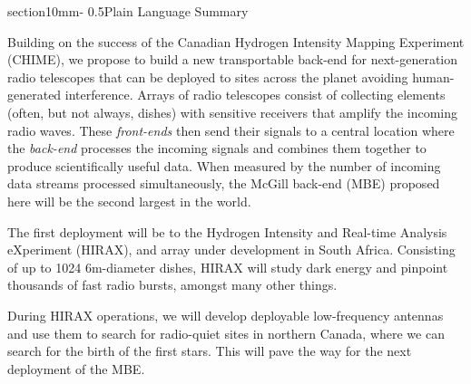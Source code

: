 \documentclass[letterpaper,11pt,preprint]{aastex}
\makeatletter
\newcommand{\mbe}{{\rm MBE}}
\renewcommand{\section}{\@startsection%
{section}{1}{0mm}{-\baselineskip}%
{0.5\baselineskip}{\normalfont\Large\bfseries}}%
\makeatother
\begin{document}
\pagestyle{plain}

\section{Plain Language Summary}

Building on the success of the Canadian Hydrogen Intensity Mapping
Experiment (CHIME), we propose to build a new transportable back-end
for next-generation radio telescopes that can be deployed to sites
across the planet avoiding human-generated interference.  Arrays of
radio telescopes consist of collecting elements (often, but not
always, dishes) with sensitive receivers that amplify the incoming
radio waves.  These {\textit{front-ends}} then send their signals to a
central location where the {\textit{back-end}} processes the incoming
signals and combines them together to produce scientifically useful
data.  When measured by the number of incoming data streams processed
simultaneously, the McGill back-end (\mbe) proposed here will be the
second largest in the world.

The first deployment will be to the Hydrogen Intensity and Real-time
Analysis eXperiment (HIRAX), and array under development in South
Africa.  Consisting of up to 1024 6m-diameter dishes, HIRAX will study
dark energy and pinpoint thousands of fast radio bursts, amongst many
other things.  

During HIRAX operations, we will develop deployable
low-frequency antennas and use them to search for radio-quiet sites in
northern Canada, where we can search for the birth of the first
stars.  This will pave the way for the next deployment of the \mbe.  
\end{document}
